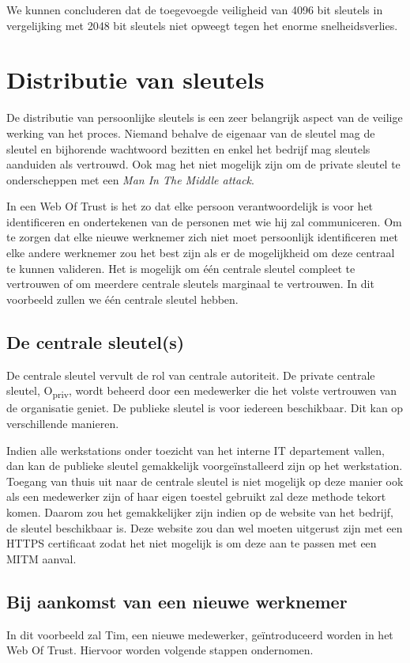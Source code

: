 We kunnen concluderen dat de toegevoegde veiligheid van 4096 bit sleutels in
vergelijking met 2048 bit sleutels niet opweegt tegen het enorme
snelheidsverlies.

\section{Distributie van sleutels}
\label{sec:distributie-van-sleutels}

De distributie van persoonlijke sleutels is een zeer belangrijk aspect van de
veilige werking van het proces. Niemand behalve de eigenaar van de sleutel mag
de sleutel en bijhorende wachtwoord bezitten en enkel het bedrijf mag sleutels
aanduiden als vertrouwd. Ook mag het niet mogelijk zijn om de private sleutel te
onderscheppen met een \textit{Man In The Middle attack}.

In een Web Of Trust is het zo dat elke persoon verantwoordelijk is voor het
identificeren en ondertekenen van de personen met wie hij zal communiceren. Om
te zorgen dat elke nieuwe werknemer zich niet moet persoonlijk identificeren met
elke andere werknemer zou het best zijn als er de mogelijkheid om deze centraal
te kunnen valideren. Het is mogelijk om één centrale sleutel compleet te
vertrouwen of om meerdere centrale sleutels marginaal te vertrouwen. In dit
voorbeeld zullen we één centrale sleutel hebben.

\subsection{De centrale sleutel(s)}
De centrale sleutel vervult de rol van centrale autoriteit. De private centrale
sleutel, O\textsubscript{priv}, wordt beheerd door een medewerker die het volste
vertrouwen van de organisatie geniet. De publieke sleutel is voor iedereen
beschikbaar. Dit kan op verschillende manieren.

Indien alle werkstations onder toezicht van het interne IT departement vallen,
dan kan de publieke sleutel gemakkelijk voorgeïnstalleerd zijn op het
werkstation. Toegang van thuis uit naar de centrale sleutel is niet mogelijk op
deze manier ook als een medewerker zijn of haar eigen toestel gebruikt zal deze
methode tekort komen. Daarom zou het gemakkelijker zijn indien op de website van
het bedrijf, de sleutel beschikbaar is. Deze website zou dan wel moeten
uitgerust zijn met een HTTPS certificaat zodat het niet mogelijk is om deze aan
te passen met een MITM aanval.

\subsection{Bij aankomst van een nieuwe werknemer}
\label{subsec:aankomst-nieuwe-werknemer}
In dit voorbeeld zal Tim, een nieuwe medewerker, geïntroduceerd worden in het
Web Of Trust. Hiervoor worden volgende stappen ondernomen.

